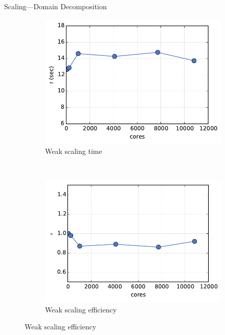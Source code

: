 \documentclass{beamer}
\begin{document}
\begin{frame}{Scaling---Domain Decomposition}
\begin{figure}
    \begin{subfigure}{0.35\textwidth}
      \centering
      \includegraphics[width=\textwidth]{weak_dd_time}
      \caption{Weak scaling time}
    \end{subfigure}
    ~
    \begin{subfigure}{0.35\textwidth}
      \centering
      \includegraphics[width=\textwidth]{weak_dd_eff}
      \caption{Weak scaling efficiency}
    \end{subfigure}
  \end{figure}

\end{frame}

\end{document}
